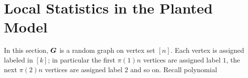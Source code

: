 \section{Local Statistics in the Planted Model}
In this section, $\boldsymbol{G}$ is a random graph on vertex set $[n]$.  Each vertex is assigned labeled in $[k]$; in particular the first $\pi(1)n$ vertices are assigned label $1$, the next $\pi(2)n$ vertices are assigned label $2$ and so on.  Recall polynomial 